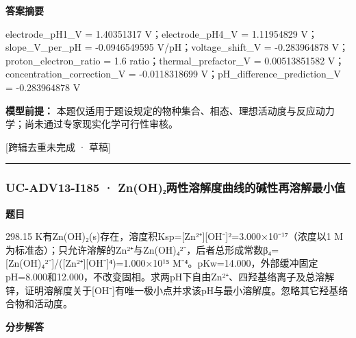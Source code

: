 \documentclass[UTF8,11pt,a4paper]{ctexart}
\begin{document}
\noindent\textbf{答案摘要}\par
electrode\_pH1\_V = 1.40351317 V；electrode\_pH4\_V = 1.11954829 V；slope\_V\_per\_pH = -0.0946549595 V/pH；voltage\_shift\_V = -0.283964878 V；proton\_electron\_ratio = 1.6 ratio；thermal\_prefactor\_V = 0.00513851582 V；concentration\_correction\_V = -0.0118318699 V；pH\_difference\_prediction\_V = -0.283964878 V\par
\noindent\textbf{模型前提：}
本题仅适用于题设规定的物种集合、相态、理想活动度与反应动力学；尚未通过专家现实化学可行性审核。\par
\noindent\textcolor{red!65!black}{[跨辑去重未完成 · 草稿]} \par
\medskip\hrule\medskip
{}
\subsubsection*{UC-ADV13-I185 · Zn(OH)₂两性溶解度曲线的碱性再溶解最小值}
\noindent\textbf{题目}\par
298.15 K有Zn(OH)₂(s)存在，溶度积Ksp=[Zn²⁺][OH⁻]²=3.000×10⁻¹⁷（浓度以1 M为标准态）；只允许溶解的Zn²⁺与Zn(OH)₄²⁻，后者总形成常数β₄=[Zn(OH)₄²⁻]/([Zn²⁺][OH⁻]⁴)=1.000×10¹⁵ M⁻⁴。pKw=14.000，外部缓冲固定pH=8.000和12.000，不改变固相。求两pH下自由Zn²⁺、四羟基络离子及总溶解锌，证明溶解度关于[OH⁻]有唯一极小点并求该pH与最小溶解度。忽略其它羟基络合物和活动度。\par
\medskip\noindent\textbf{分步解答}
\end{document}
